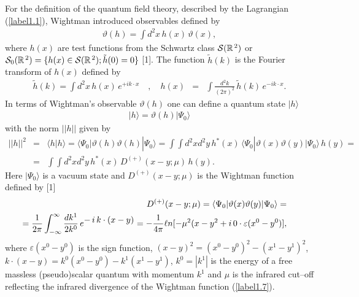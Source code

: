 \documentclass[a4paper,12pt] {article}
\begin{document}
For the definition of the quantum field theory, described by the
Lagrangian (\ref{label1.1}), Wightman introduced observables defined
by
%
\begin{eqnarray}\label{label1.3}
\vartheta(h) = \int d^2x\,h(x)\,\vartheta(x),
\end{eqnarray}
%
where $h(x)$ are test functions from the Schwartz class ${\cal
S}(\mathbb{R}^{\,2})$ or ${\cal S}_0(\mathbb{R}^{\,2}) = \{h(x) \in
{\cal S}(\mathbb{R}^{\,2}); \tilde{h}(0) = 0\}$ [1]. The function
$\tilde{h}(k)$ is the Fourier transform of $h(x)$ defined by
%
\begin{eqnarray}\label{label1.4}
\tilde{h}(k) = \int d^2x\,h(x)\,e^{\textstyle + ik\cdot x}\quad,\quad
h(x) &=& \int \frac{d^2k}{(2\pi)^2}\,\tilde{h}(k)
\,e^{\textstyle - ik\cdot x}.
\end{eqnarray}
%
In terms of Wightman's observable $\vartheta(h)$ one can define a
quantum state $|h\rangle$ 
%
\begin{eqnarray}\label{label1.5}
|h\rangle = \vartheta(h)|\Psi_0\rangle
\end{eqnarray}
%
with the norm $||h||$ given by
%
\begin{eqnarray}\label{label1.6}
||h||^2 &=& \langle h|h\rangle = \langle
  \Psi_0|\vartheta(h)\vartheta(h)| \Psi_0\rangle = \int\!\!\!\int
  d^2xd^2y\,h^*(x)\,\langle
  \Psi_0|\vartheta(x)\vartheta(y)|\Psi_0\rangle\,h(y) = \nonumber\\
  &=&\int\!\!\!\int d^2xd^2y\,h^*(x)\,D^{(+)}(x-y; \mu)\,h(y).
\end{eqnarray}
%
Here $|\Psi_0\rangle$ is a vacuum state and $D^{(+)}(x-y; \mu)$ is the
Wightman function defined by [1]
%
\begin{eqnarray}\label{label1.7}
\hspace{-0.3in}&&D^{(+)}(x -y ;\mu) = \langle
\Psi_0|\vartheta(x)\vartheta(y)|\Psi_0\rangle =\nonumber\\
\hspace{-0.3in}&&=
\frac{1}{2\pi}\int^{\infty}_{-\infty}\frac{dk^1}{2k^0}\,e^{\textstyle
-\,i\,k\cdot (x - y)} = - \frac{1}{4\pi}{\ell n}[-\mu^2(x - y^2 +
i\,0\cdot\varepsilon(x^0 - y^0)],
\end{eqnarray}
%
where $\varepsilon(x^0 - y^0)$ is the sign function, $(x - y)^2 = (x^0
- y^0)^2 - (x^1 - y^1)^2$, $k\cdot (x - y) = k^0(x^0 - y^0) - k^1(x^1
- y^1)$, $k^0 = |k^1|$ is the energy of a free massless (pseudo)scalar
quantum with momentum $k^1$ and $\mu$ is the infrared cut--off
reflecting the infrared divergence of the Wightman function
(\ref{label1.7}).
\end{document}
